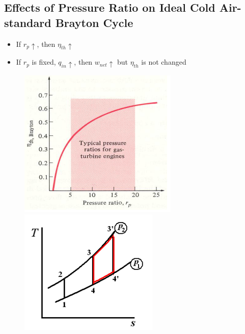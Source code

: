\documentclass[class=report, crop=false, 12pt,a4paper]{standalone}
\numberwithin{equation}{section}
\begin{document}
\subsection{Effects of Pressure Ratio on Ideal Cold Air-standard Brayton Cycle}
\begin{itemize}[noitemsep]
  \item If $r_p \uparrow$, then $\eta_{th} \uparrow$
  \item If $r_p$ is fixed, $q_{in}\uparrow$, then $w_{net}\uparrow$ but $\eta_{th}$ is not changed
\end{itemize}
\begin{figure}[H]
  \begin{center}
    \begin{minipage}[b]{0.46\textwidth}
      \centering
      \includegraphics[width = 0.85 \textwidth]{../img/diagram156.png}
      \caption{}
    \end{minipage}
    \begin{minipage}[b]{0.46\textwidth}
      \centering
      \includegraphics[width = 0.85 \textwidth]{../img/diagram157.png}
      \caption{}
    \end{minipage}
  \end{center}
\end{figure}
\end{document}
